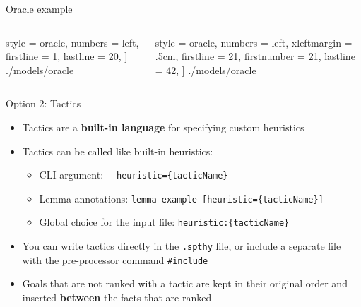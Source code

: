 \documentclass[11pt,aspectratio=169]{beamer}
\begin{document}
\begin{frame}[fragile,t]{Oracle example}
    \vsep
    \vspace*{-.5cm}
    \begin{columns}[T]
        \begin{column}{0.5\textwidth}
            
                style = oracle,
                numbers = left,
                firstline = 1,
                lastline = 20,
            ] {./models/oracle}
        \end{column}
        \begin{column}{0.5\textwidth}
            
                style = oracle,
                numbers = left,
                xleftmargin = .5cm,
                firstline = 21,
                firstnumber = 21,
                lastline = 42,
            ] {./models/oracle}
        \end{column}
    \end{columns}
\end{frame}

\begin{frame}[fragile]{Option 2: Tactics}
    \begin{itemize}
        \item Tactics are a \textbf{built-in language} for specifying custom 
              heuristics
        \item Tactics can be called like built-in heuristics:
        \begin{itemize}
            \item CLI argument: \verb|--heuristic={tacticName}|
            \item Lemma annotations:
                  \verb|lemma example [heuristic={tacticName}]|
            \item Global choice for the input file:
                  \verb|heuristic:{tacticName}|
        \end{itemize}
        \item You can write tactics directly in the \verb|.spthy| file, or 
              include a separate file with the pre-processor command
              \verb|#include|
        \item Goals that are not ranked with a tactic are kept in their 
              original order and inserted \textbf{between} the facts that are 
              ranked
    \end{itemize}
\end{frame}
\end{document}
